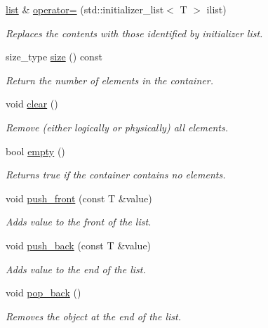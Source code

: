 \begin{DoxyCompactItemize}
\mbox{\label{classsc_1_1list_a76e3d0a3ff5454a6d58d94bd53e56b4f}} 
\mbox{\hyperlink{classsc_1_1list}{list}} \& \mbox{\hyperlink{classsc_1_1list_a76e3d0a3ff5454a6d58d94bd53e56b4f}{operator=}} (std\+::initializer\+\_\+list$<$ T $>$ ilist)
\begin{DoxyCompactList}\small\item\em Replaces the contents with those identified by initializer list. \end{DoxyCompactList}\item 
size\+\_\+type \mbox{\hyperlink{classsc_1_1list_a0fe585f3f9e33058294c3a590c7bfdea}{size}} () const
\begin{DoxyCompactList}\small\item\em Return the number of elements in the container. \end{DoxyCompactList}\item 
void \mbox{\hyperlink{classsc_1_1list_aece86319a40d15b88fd1a981ba1a226e}{clear}} ()
\begin{DoxyCompactList}\small\item\em Remove (either logically or physically) all elements. \end{DoxyCompactList}\item 
bool \mbox{\hyperlink{classsc_1_1list_a8599ccd8f27e0f39a1c3051cd9d05bdb}{empty}} ()
\begin{DoxyCompactList}\small\item\em Returns {\ttfamily true} if the container contains no elements. \end{DoxyCompactList}\item 
void \mbox{\hyperlink{classsc_1_1list_a24a7b8a81765dfe0351ddb263bc6d754}{push\+\_\+front}} (const T \&value)
\begin{DoxyCompactList}\small\item\em Adds {\ttfamily value} to the front of the list. \end{DoxyCompactList}\item 
void \mbox{\hyperlink{classsc_1_1list_a1d77cdaeacca7959989873617a753c96}{push\+\_\+back}} (const T \&value)
\begin{DoxyCompactList}\small\item\em Adds {\ttfamily value} to the end of the list. \end{DoxyCompactList}\item 
void \mbox{\hyperlink{classsc_1_1list_a3d6fc0a4f2c1db7c74af5a482c1a03ca}{pop\+\_\+back}} ()
\begin{DoxyCompactList}\small\item\em Removes the object at the end of the list. \end{DoxyCompactList}\item 

\end{DoxyCompactItemize}
